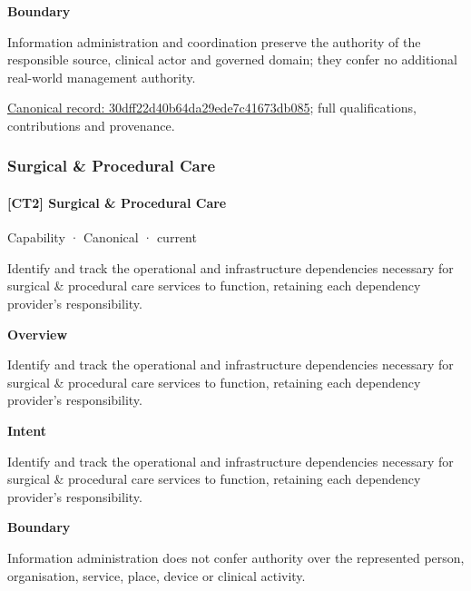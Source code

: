 \textbf{Boundary}



Information administration and coordination preserve the authority of the responsible source, clinical actor and governed domain; they confer no additional real-world management authority.


{\footnotesize \href{../../../../continuum/strategy/capability/30dff22d40b64da29ede7c41673db085.md}{Canonical record: 30dff22d40b64da29ede7c41673db085}; full qualifications, contributions and provenance.}\par
\subsubsection{Surgical \& Procedural Care}

\paragraph{[CT2] Surgical \& Procedural Care}

\label{element:c9a26d1aa1014545b9ae759b663c807b}
{\small Capability · Canonical · current}\par

Identify and track the operational and infrastructure dependencies necessary for surgical \& procedural care services to function, retaining each dependency provider's responsibility.



\textbf{Overview}



Identify and track the operational and infrastructure dependencies necessary for surgical \& procedural care services to function, retaining each dependency provider's responsibility.



\textbf{Intent}



Identify and track the operational and infrastructure dependencies necessary for surgical \& procedural care services to function, retaining each dependency provider's responsibility.



\textbf{Boundary}



Information administration does not confer authority over the represented person, organisation, service, place, device or clinical activity.



